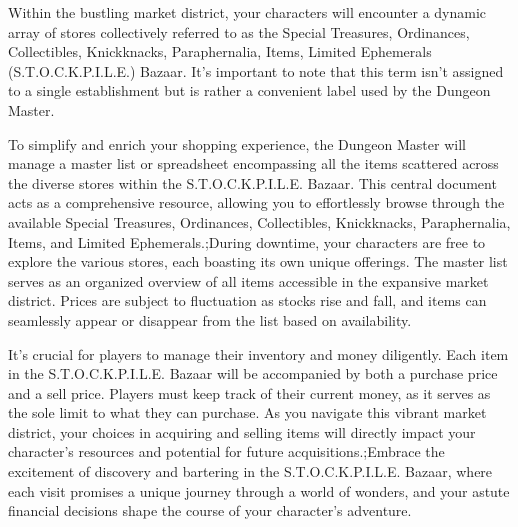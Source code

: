 Within the bustling market district, your characters will encounter a dynamic array of stores collectively referred to as the Special Treasures, Ordinances, Collectibles, Knickknacks, Paraphernalia, Items, Limited Ephemerals (S.T.O.C.K.P.I.L.E.) Bazaar. It's important to note that this term isn't assigned to a single establishment but is rather a convenient label used by the Dungeon Master.

To simplify and enrich your shopping experience, the Dungeon Master will manage a master list or spreadsheet encompassing all the items scattered across the diverse stores within the S.T.O.C.K.P.I.L.E. Bazaar. This central document acts as a comprehensive resource, allowing you to effortlessly browse through the available Special Treasures, Ordinances, Collectibles, Knickknacks, Paraphernalia, Items, and Limited Ephemerals.;During downtime, your characters are free to explore the various stores, each boasting its own unique offerings. The master list serves as an organized overview of all items accessible in the expansive market district. Prices are subject to fluctuation as stocks rise and fall, and items can seamlessly appear or disappear from the list based on availability.

It's crucial for players to manage their inventory and money diligently. Each item in the S.T.O.C.K.P.I.L.E. Bazaar will be accompanied by both a purchase price and a sell price. Players must keep track of their current money, as it serves as the sole limit to what they can purchase. As you navigate this vibrant market district, your choices in acquiring and selling items will directly impact your character's resources and potential for future acquisitions.;Embrace the excitement of discovery and bartering in the S.T.O.C.K.P.I.L.E. Bazaar, where each visit promises a unique journey through a world of wonders, and your astute financial decisions shape the course of your character's adventure.
